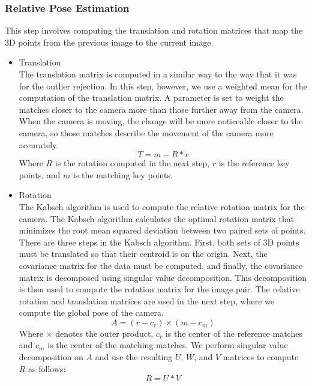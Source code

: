 \subsubsection{Relative Pose Estimation}
	This step involves computing the translation and rotation matrices that map the 3D points from the previous image to the current image.
\begin{itemize}
\item{Translation} \\
	The translation matrix is computed in a similar way to the way that it was for the outlier rejection. In this step, however, we use a weighted mean for the computation of the translation matrix. A parameter is set to weight the matches closer to the camera more than those further away from the camera. When the camera is moving, the change will be more noticeable closer to the camera, so those matches describe the movement of the camera more accurately.
$$T = m - R*r$$
Where $R$ is the rotation computed in the next step, $r$ is the reference key points, and $m$ is the matching key points.
\item{Rotation} \\
	The Kabsch algorithm is used to compute the relative rotation matrix for the camera. The Kabsch algorithm calculates the optimal rotation matrix that minimizes the root mean squared deviation between two paired sets of points. There are three steps in the Kabsch algorithm. First, both sets of 3D points must be translated so that their centroid is on the origin. Next, the covariance matrix for the data must be computed, and finally, the covariance matrix is decomposed using singular value decomposition. This decomposition is then used to compute the rotation matrix for the image pair. The relative rotation and translation matrices are used in the next step, where we compute the global pose of the camera.
$$A = (r-c_r)\times(m-c_m)$$
Where $\times$ denotes the outer product, $c_{r}$ is the center of the reference matches and $c_{m}$ is the center of the matching matches. We perform singular value decomposition on $A$ and use the resulting $U$, $W$, and $V$ matrices to compute $R$ as follows:
$$R = U*V$$
\end{itemize}

